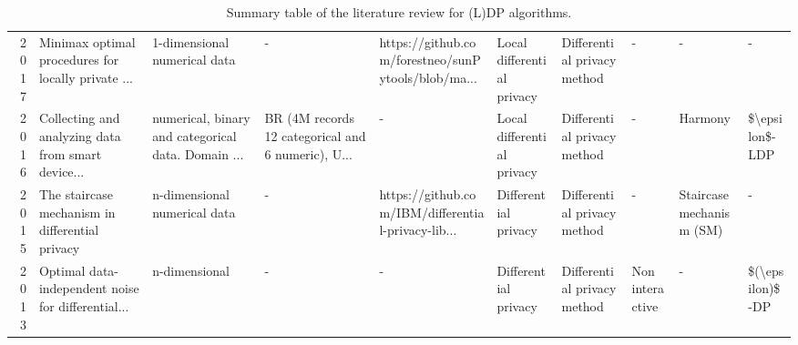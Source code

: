 \begin{landscape}
\begin{table}[ht]
\begin{adjustbox}{width=1.8\textwidth}
\begin{tabular}{rlllllllll}
        2017                   & Minimax optimal procedures for locally private ... & 1-dimensional numerical data                       & -                                                  & https://github.com/forestneo/sunPytools/blob/ma... & Local differential privacy & Differential privacy method & -               & -                          & -                               \\
        2016                   & Collecting and analyzing data from smart device... & numerical, binary and categorical data. Domain ... & BR (4M records 12 categorical and 6 numeric), U... & -                                                  & Local differential privacy & Differential privacy method & -               & Harmony                    & \$\textbackslash epsilon\$-LDP  \\
        2015                   & The staircase mechanism in differential privacy    & n-dimensional numerical data                       & -                                                  & https://github.com/IBM/differential-privacy-lib... & Differential privacy       & Differential privacy method & -               & Staircase mechanism (SM)   & -                               \\
        2013                   & Optimal data-independent noise for differential... & n-dimensional                                      & -                                                  & -                                                  & Differential privacy       & Differential privacy method & Non interactive & -                          & \$(\textbackslash epsilon)\$-DP \\
        \bottomrule
      \end{tabular}
    \end{adjustbox}
    \caption{Summary table of the literature review for (L)DP algorithms.}
  \end{table}
\end{landscape}
